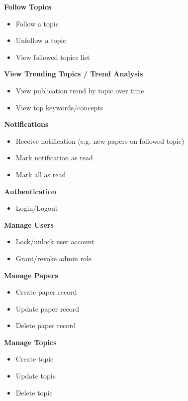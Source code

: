 \documentclass[12pt,a4paper]{article}
\begin{document}
{{\textbf{Follow Topics}
\begin{itemize}[leftmargin=*, itemsep=1pt, topsep=2pt, label=--]
	\item Follow a topic
	\item Unfollow a topic
	\item View followed topics list
\end{itemize}

\textbf{View Trending Topics / Trend Analysis}
\begin{itemize}[leftmargin=*, itemsep=1pt, topsep=2pt, label=--]
	\item View publication trend by topic over time
	\item View top keywords/concepts
\end{itemize}

\textbf{Notifications}
\begin{itemize}[leftmargin=*, itemsep=1pt, topsep=2pt, label=--]
	\item Receive notification (e.g. new papers on followed topic)
	\item Mark notification as read
	\item Mark all as read
\end{itemize}



\textbf{Authentication}
\begin{itemize}[leftmargin=*, itemsep=1pt, topsep=2pt, label=--]
	\item Login/Logout
\end{itemize}

\textbf{Manage Users}
\begin{itemize}[leftmargin=*, itemsep=1pt, topsep=2pt, label=--]
	\item Lock/unlock user account
	\item Grant/revoke admin role
\end{itemize}

\textbf{Manage Papers}
\begin{itemize}[leftmargin=*, itemsep=1pt, topsep=2pt, label=--]
	\item Create paper record
	\item Update paper record
	\item Delete paper record
\end{itemize}

\textbf{Manage Topics}
\begin{itemize}[leftmargin=*, itemsep=1pt, topsep=2pt, label=--]
	\item Create topic
	\item Update topic
	\item Delete topic
\end{itemize}

}}
\end{document}

